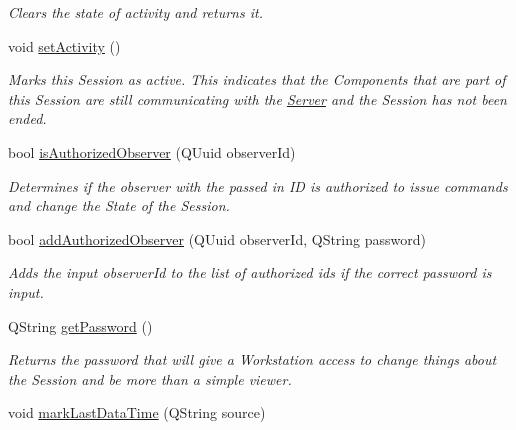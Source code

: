 \begin{DoxyCompactItemize}
\begin{DoxyCompactList}\small\item\em Clears the state of activity and returns it. \end{DoxyCompactList}\item 
\hypertarget{class_session_info_a6dc97be03b8702d3c69731d22549c0bd}{void \hyperlink{class_session_info_a6dc97be03b8702d3c69731d22549c0bd}{set\-Activity} ()}\label{class_session_info_a6dc97be03b8702d3c69731d22549c0bd}

\begin{DoxyCompactList}\small\item\em Marks this Session as active. This indicates that the Components that are part of this Session are still communicating with the \hyperlink{class_server}{Server} and the Session has not been ended. \end{DoxyCompactList}\item 
bool \hyperlink{class_session_info_a0ff76e3e53c97f45bbc9c48ce6171fa7}{is\-Authorized\-Observer} (Q\-Uuid observer\-Id)
\begin{DoxyCompactList}\small\item\em Determines if the observer with the passed in I\-D is authorized to issue commands and change the State of the Session. \end{DoxyCompactList}\item 
bool \hyperlink{class_session_info_aca010ce44ab021ce6b6a36ef6679f41f}{add\-Authorized\-Observer} (Q\-Uuid observer\-Id, Q\-String password)
\begin{DoxyCompactList}\small\item\em Adds the input observer\-Id to the list of authorized ids if the correct password is input. \end{DoxyCompactList}\item 
\hypertarget{class_session_info_a978758277af3afdc72344f9ae191a5d6}{Q\-String \hyperlink{class_session_info_a978758277af3afdc72344f9ae191a5d6}{get\-Password} ()}\label{class_session_info_a978758277af3afdc72344f9ae191a5d6}

\begin{DoxyCompactList}\small\item\em Returns the password that will give a Workstation access to change things about the Session and be more than a simple viewer. \end{DoxyCompactList}\item 
\hypertarget{class_session_info_afee5f4251163bcef2300cfafe99688c4}{void \hyperlink{class_session_info_afee5f4251163bcef2300cfafe99688c4}{mark\-Last\-Data\-Time} (Q\-String source)}\label{class_session_info_afee5f4251163bcef2300cfafe99688c4}


\end{DoxyCompactItemize}
